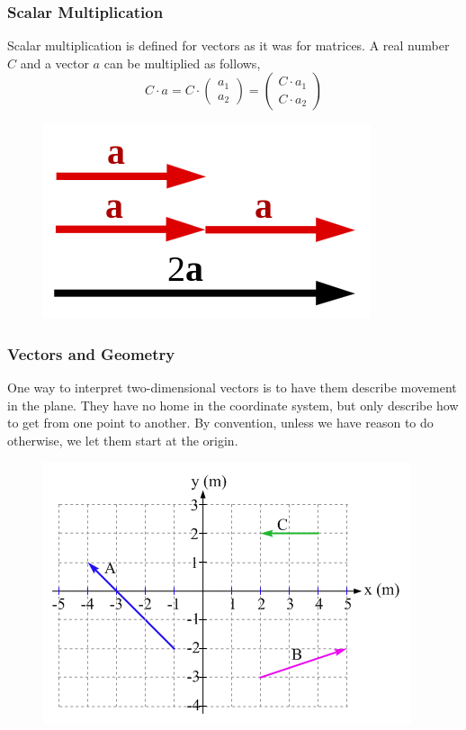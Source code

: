 \documentclass[xcolor=dvipsnames]{beamer}
\begin{document}
\begin{frame}
  \frametitle{Scalar Multiplication}
Scalar multiplication is defined for vectors as it was for matrices. A
real number $C$ and a vector $a$ can be multiplied as follows,
\begin{equation}
  \label{eq:oyeizaeb}
  C\cdot{}a=C\cdot\left(
    \begin{array}{c}
      a_{1} \\
      a_{2}
    \end{array}\right)=
\left(
    \begin{array}{c}
      C\cdot{}a_{1} \\
      C\cdot{}a_{2}
    \end{array}\right)
\end{equation}
  \begin{figure}[h]
    \includegraphics[scale=.5]{./scalarmultiplication.png}
  \end{figure}
\end{frame}

\begin{frame}
  \frametitle{Vectors and Geometry}
One way to interpret two-dimensional vectors is to have them describe
movement in the plane. They have no home in the coordinate system, but
only describe how to get from one point to another. By convention,
unless we have reason to do otherwise, we let them start at the origin.
  \begin{figure}[h]
    \includegraphics[scale=.5]{./veccoor.png}
  \end{figure}
\end{frame}
\end{document}

